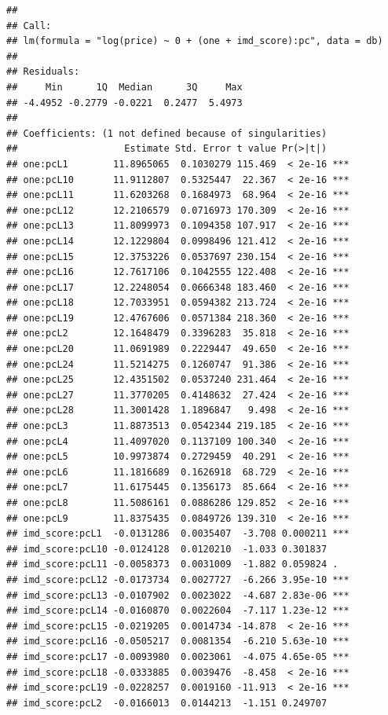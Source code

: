 \documentclass[]{book}
\begin{document}
\begin{verbatim}
## 
## Call:
## lm(formula = "log(price) ~ 0 + (one + imd_score):pc", data = db)
## 
## Residuals:
##     Min      1Q  Median      3Q     Max 
## -4.4952 -0.2779 -0.0221  0.2477  5.4973 
## 
## Coefficients: (1 not defined because of singularities)
##                   Estimate Std. Error t value Pr(>|t|)    
## one:pcL1        11.8965065  0.1030279 115.469  < 2e-16 ***
## one:pcL10       11.9112807  0.5325447  22.367  < 2e-16 ***
## one:pcL11       11.6203268  0.1684973  68.964  < 2e-16 ***
## one:pcL12       12.2106579  0.0716973 170.309  < 2e-16 ***
## one:pcL13       11.8099973  0.1094358 107.917  < 2e-16 ***
## one:pcL14       12.1229804  0.0998496 121.412  < 2e-16 ***
## one:pcL15       12.3753226  0.0537697 230.154  < 2e-16 ***
## one:pcL16       12.7617106  0.1042555 122.408  < 2e-16 ***
## one:pcL17       12.2248054  0.0666348 183.460  < 2e-16 ***
## one:pcL18       12.7033951  0.0594382 213.724  < 2e-16 ***
## one:pcL19       12.4767606  0.0571384 218.360  < 2e-16 ***
## one:pcL2        12.1648479  0.3396283  35.818  < 2e-16 ***
## one:pcL20       11.0691989  0.2229447  49.650  < 2e-16 ***
## one:pcL24       11.5214275  0.1260747  91.386  < 2e-16 ***
## one:pcL25       12.4351502  0.0537240 231.464  < 2e-16 ***
## one:pcL27       11.3770205  0.4148632  27.424  < 2e-16 ***
## one:pcL28       11.3001428  1.1896847   9.498  < 2e-16 ***
## one:pcL3        11.8873513  0.0542344 219.185  < 2e-16 ***
## one:pcL4        11.4097020  0.1137109 100.340  < 2e-16 ***
## one:pcL5        10.9973874  0.2729459  40.291  < 2e-16 ***
## one:pcL6        11.1816689  0.1626918  68.729  < 2e-16 ***
## one:pcL7        11.6175445  0.1356173  85.664  < 2e-16 ***
## one:pcL8        11.5086161  0.0886286 129.852  < 2e-16 ***
## one:pcL9        11.8375435  0.0849726 139.310  < 2e-16 ***
## imd_score:pcL1  -0.0131286  0.0035407  -3.708 0.000211 ***
## imd_score:pcL10 -0.0124128  0.0120210  -1.033 0.301837    
## imd_score:pcL11 -0.0058373  0.0031009  -1.882 0.059824 .  
## imd_score:pcL12 -0.0173734  0.0027727  -6.266 3.95e-10 ***
## imd_score:pcL13 -0.0107902  0.0023022  -4.687 2.83e-06 ***
## imd_score:pcL14 -0.0160870  0.0022604  -7.117 1.23e-12 ***
## imd_score:pcL15 -0.0219205  0.0014734 -14.878  < 2e-16 ***
## imd_score:pcL16 -0.0505217  0.0081354  -6.210 5.63e-10 ***
## imd_score:pcL17 -0.0093980  0.0023061  -4.075 4.65e-05 ***
## imd_score:pcL18 -0.0333885  0.0039476  -8.458  < 2e-16 ***
## imd_score:pcL19 -0.0228257  0.0019160 -11.913  < 2e-16 ***
## imd_score:pcL2  -0.0166013  0.0144213  -1.151 0.249707    

\end{verbatim}
\end{document}
